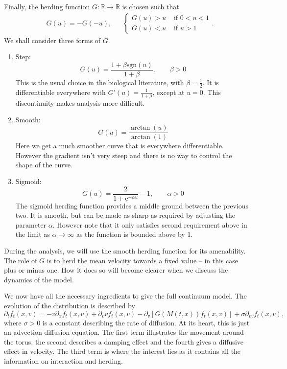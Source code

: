 \documentclass[11pt, a4paper, draft]{article}
\renewcommand{\R}{\mathbb{R}}
\begin{document}
		Finally, the herding function $G:\R \to \R$ is chosen such that
		\begin{align*}
			&G(u)=-G(-u),&& {\begin{cases}
								G(u)>u & \text{ if } 0< u <1\\
								G(u)<u & \text{ if } u > 1
				   		   \end{cases}}.
		\end{align*}
		We shall consider three forms of $G$.
		\begin{enumerate}
			\item Step:
			\[
				G(u) = \frac{1+\beta \mathrm{sgn}(u)}{1+\beta}, \qquad \beta > 0	
			\]
			This is the usual choice in the biological literature, with \(\beta = \frac{1}{2}\). It is differentiable everywhere with $G'(u) = \frac{1}{1+\beta}$, except at $u=0$. This discontinuity makes analysis more difficult.
			\item Smooth:
			\[
				G(u) = \frac{\arctan(u)}{\arctan(1)}
			\]
			Here we get a much smoother curve that is everywhere differentiable. However the gradient isn't very steep and there is no way to control the shape of the curve.
			\item Sigmoid:
			\[
				G(u) = \frac{2}{1+\mathrm{e}^{-\alpha u}} - 1 , \qquad \alpha >0
			\]
			The sigmoid herding function provides a middle ground between the previous two. It is smooth, but can be made as sharp as required by adjusting the parameter $\alpha$. However note that it only satisfies second requirement above in the limit as $\alpha \to \infty$ as the function is bounded above by 1.
		\end{enumerate}
		During the analysis, we will use the smooth herding function for its amenability. The role of $G$ is to herd the mean velocity towards a fixed value -- in this case plus or minus one. How it does so will become clearer when we discuss the dynamics of the model.
		
		We now have all the necessary ingredients to give the full continuum model. The evolution of the distribution is described by
		\begin{equation}\label{eq:fullPDE}
			\partial_t f_t(x,v) = -v\partial_x f_t(x,v)  +\partial_v v f_t(x,v) - \partial_v \left[ G(M(t,x))f_t(x,v)\right] + \sigma \partial_{vv}f_t(x,v),
		\end{equation}
		where $\sigma > 0$ is a constant describing the rate of diffusion. At its heart, this is just an advection-diffusion equation. The first term illustrates the movement around the torus, the second describes a damping effect and the fourth gives a diffusive effect in velocity. The third term is where the interest lies as it contains all the information on interaction and herding.
		
\end{document}
